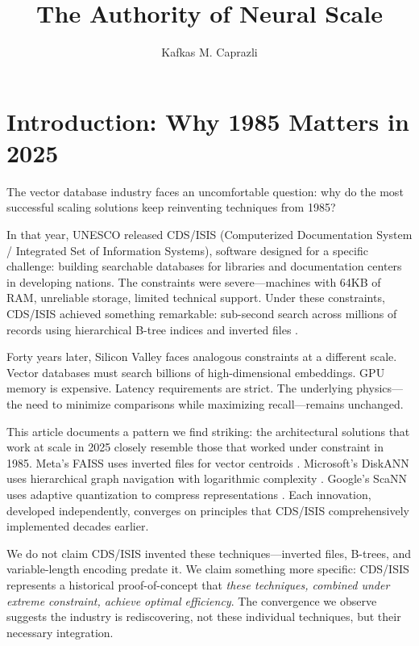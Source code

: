 \documentclass[manuscript,screen,nonacm]{acmart}
\title{The Authority of Neural Scale}
\author{Kafkas M. Caprazli}
\affiliation{%
  \institution{Independent Researcher}
  \city{Wolfsburg}
  \country{Germany}
}
\begin{document}
\maketitle

\section{Introduction: Why 1985 Matters in 2025}

The vector database industry faces an uncomfortable question: why do the most successful scaling solutions keep reinventing techniques from 1985?

In that year, UNESCO released CDS/ISIS (Computerized Documentation System / Integrated Set of Information Systems), software designed for a specific challenge: building searchable databases for libraries and documentation centers in developing nations. The constraints were severe---machines with 64KB of RAM, unreliable storage, limited technical support. Under these constraints, CDS/ISIS achieved something remarkable: sub-second search across millions of records using hierarchical B-tree indices and inverted files \cite{delbigio1995, unesco1989}.

Forty years later, Silicon Valley faces analogous constraints at a different scale. Vector databases must search billions of high-dimensional embeddings. GPU memory is expensive. Latency requirements are strict. The underlying physics---the need to minimize comparisons while maximizing recall---remains unchanged.

This article documents a pattern we find striking: the architectural solutions that work at scale in 2025 closely resemble those that worked under constraint in 1985. Meta's FAISS uses inverted files for vector centroids \cite{johnson2017}. Microsoft's DiskANN uses hierarchical graph navigation with logarithmic complexity \cite{subramanya2019}. Google's ScaNN uses adaptive quantization to compress representations \cite{guo2020}. Each innovation, developed independently, converges on principles that CDS/ISIS comprehensively implemented decades earlier.

We do not claim CDS/ISIS invented these techniques---inverted files, B-trees, and variable-length encoding predate it. We claim something more specific: CDS/ISIS represents a historical proof-of-concept that \emph{these techniques, combined under extreme constraint, achieve optimal efficiency}. The convergence we observe suggests the industry is rediscovering, not these individual techniques, but their necessary integration.
\end{document}
